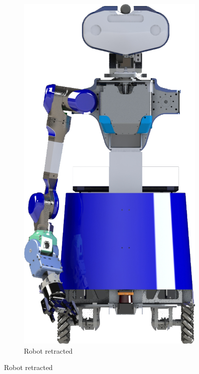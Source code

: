 \documentclass[runningheads,a4paper]{llncs}
\begin{document}
\begin{figure}[h!]
  \centering
  \begin{subfigure}[b]{0.15\linewidth}
    \includegraphics[width=\linewidth]{images/sara_render_retracted.png}
    \caption{Robot retracted}
  \end{subfigure}

\end{figure}
\end{document}
